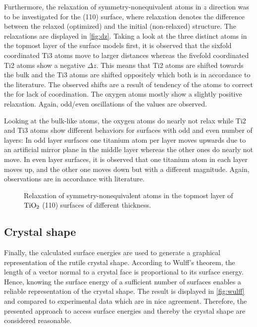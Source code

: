 \documentclass[a4paper,12pt,parskip=half]{scrartcl}
\begin{document}
Furthermore, the relaxation of symmetry-nonequivalent atoms in $ z $ direction was to be investigated for the (110) surface, where relaxation denotes the difference between the relaxed (optimized) and the initial (non-relaxed) structure. The relaxations are displayed in \autoref{fig:dz}. Taking a look at the three distinct atoms in the topmost layer of the surface models first, it is observed that the sixfold coordinated Ti3 atoms move to larger distances whereas the fivefold coordinated Ti2 atoms show a negative $ \Delta z $. This means that Ti2 atoms are shifted towards the bulk and the Ti3 atoms are shifted oppositely which both is in accordance to the literature.\autocite[]{rutile-surface-energy} The observed shifts are a result of tendency of the atoms to correct the for lack of coordination. The oxygen atoms mostly show a slightly positive relaxation. Again, odd/even oscillations of the values are observed. 

Looking at the bulk-like atoms, the oxygen atoms do nearly not relax while Ti2 and Ti3 atoms show different behaviors for surfaces with odd and even number of layers: In odd layer surfaces one titanium atom per layer moves upwards due to an artificial mirror plane in the middle layer whereas the other ones do nearly not move. In even layer surfaces, it is observed that one titanium atom in each layer moves up, and the other one moves down but with a different magnitude. Again, observations are in accordance with literature.\autocite[]{rutile-surface-energy}
%
\begin{figure}[H]
	\centering
	
	\vspace{-20pt}
	\caption{Relaxation of symmetry-nonequivalent atoms in the topmost layer of $ \ce{TiO2} $ (110) surfaces of different thickness.}
	\label{fig:dz}
\end{figure}
%
\subsection{Crystal shape}
%
Finally, the calculated surface energies are used to generate a graphical representation of the rutile crystal shape. According to Wulff's theorem, the length of a vector normal to a crystal face is proportional to its surface energy. Hence, knowing the surface energy of a sufficient number of surfaces enables a reliable representation of the crystal shape. The result is displayed in \autoref{fig:wulff} and compared to experimental data which are in nice agreement. Therefore, the presented approach to access surface energies and thereby the crystal shape are considered reasonable.
\end{document}
